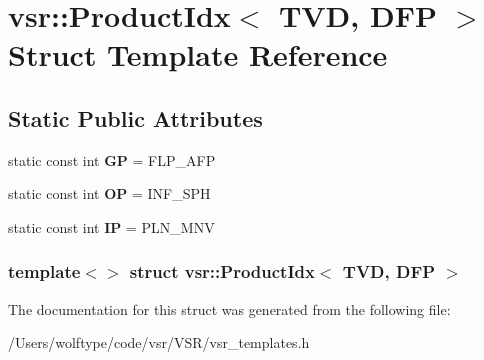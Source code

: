 \hypertarget{structvsr_1_1_product_idx_3_01_t_v_d_00_01_d_f_p_01_4}{\section{vsr\-:\-:Product\-Idx$<$ T\-V\-D, D\-F\-P $>$ Struct Template Reference}
\label{structvsr_1_1_product_idx_3_01_t_v_d_00_01_d_f_p_01_4}
}
\subsection*{Static Public Attributes}
\begin{DoxyCompactItemize}
\item 
\hypertarget{structvsr_1_1_product_idx_3_01_t_v_d_00_01_d_f_p_01_4_aa6bea694534f9572a2ccc5ca04233927}{static const int {\bfseries G\-P} = F\-L\-P\-\_\-\-A\-F\-P}\label{structvsr_1_1_product_idx_3_01_t_v_d_00_01_d_f_p_01_4_aa6bea694534f9572a2ccc5ca04233927}

\item 
\hypertarget{structvsr_1_1_product_idx_3_01_t_v_d_00_01_d_f_p_01_4_a73948b6dd03efe2022b856181ed9c383}{static const int {\bfseries O\-P} = I\-N\-F\-\_\-\-S\-P\-H}\label{structvsr_1_1_product_idx_3_01_t_v_d_00_01_d_f_p_01_4_a73948b6dd03efe2022b856181ed9c383}

\item 
\hypertarget{structvsr_1_1_product_idx_3_01_t_v_d_00_01_d_f_p_01_4_a25e3d717845d5b85cbbf7afc598ac44b}{static const int {\bfseries I\-P} = P\-L\-N\-\_\-\-M\-N\-V}\label{structvsr_1_1_product_idx_3_01_t_v_d_00_01_d_f_p_01_4_a25e3d717845d5b85cbbf7afc598ac44b}

\end{DoxyCompactItemize}
\subsubsection*{template$<$$>$ struct vsr\-::\-Product\-Idx$<$ T\-V\-D, D\-F\-P $>$}



The documentation for this struct was generated from the following file\-:\begin{DoxyCompactItemize}
\item 
/\-Users/wolftype/code/vsr/\-V\-S\-R/vsr\-\_\-templates.\-h\end{DoxyCompactItemize}
